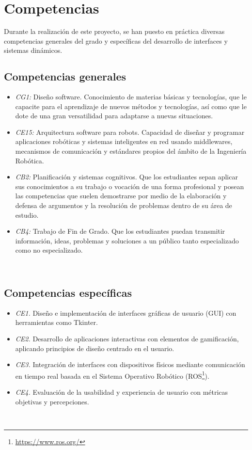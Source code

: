 \section{Competencias}
\label{sec:competencias}

Durante la realización de este proyecto, se han puesto en práctica diversas competencias generales del grado y específicas del desarrollo de interfaces y sistemas dinámicos.

\subsection{Competencias generales}
\label{sec:competencias}

\begin{itemize}
    \item \textit{CG1:} Diseño software. Conocimiento de materias básicas y tecnologías, que le capacite para el aprendizaje de nuevos métodos y tecnologías, así como que le dote de una gran versatilidad para adaptarse a nuevas situaciones.
    \item \textit{CE15:} Arquitectura software para robots. Capacidad de diseñar y programar aplicaciones robóticas y sistemas inteligentes en red usando middlewares, mecanismos de comunicación y estándares propios del ámbito de la Ingeniería Robótica.
    \item \textit{CB2:} Planificación y sistemas cognitivos. Que los estudiantes sepan aplicar sus conocimientos a su trabajo o vocación de una forma profesional y posean las competencias que suelen demostrarse por medio de la elaboración y defensa de argumentos y la resolución de problemas dentro de su área de estudio.
    \item \textit{CB4:} Trabajo de Fin de Grado. Que los estudiantes puedan transmitir información, ideas, problemas y soluciones a un público tanto especializado como no especializado.
\end{itemize}\

\subsection{Competencias específicas}
\label{sec:competencias}

\begin{itemize}
    \item \textit{CE1.} Diseño e implementación de interfaces gráficas de usuario (GUI) con herramientas como Tkinter.
    \item \textit{CE2.} Desarrollo de aplicaciones interactivas con elementos de gamificación, aplicando principios de diseño centrado en el usuario.
    \item \textit{CE3.} Integración de interfaces con dispositivos físicos mediante comunicación en tiempo real basada en el Sistema Operativo Robótico (ROS\footnote{\url{https://www.ros.org/}}).
    \item \textit{CE4.} Evaluación de la usabilidad y experiencia de usuario con métricas objetivas y percepciones.
\end{itemize}\

